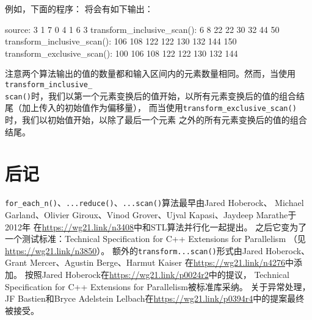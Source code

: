 例如，下面的程序：
将会有如下输出：
\begin{blacklisting}
    source:                      3 1 7 0 4 1 6 3
    transform_inclusive_scan():      6 8 22 22 30 32 44 50
    transform_inclusive_scan():      106 108 122 122 130 132 144 150
    transform_exclusive_scan():  100 106 108 122 122 130 132 144
\end{blacklisting}
注意两个算法输出的值的数量都和输入区间内的元素数量相同。然而，当使用\texttt{transform\_inclusive\_\\
scan()}时，我们以第一个元素变换后的值开始，以所有元素变换后的值的组合结尾（加上传入的初始值作为偏移量），
而当使用\texttt{transform\_exclusive\_scan()}时，我们以初始值开始，以除了最后一个元素
之外的所有元素变换后的值的组合结尾。

\section{后记}
\texttt{for\_each\_n()}、\texttt{...reduce()}、\texttt{...scan()}算法最早由Jared Hoberock、
Michael Garland、Olivier Giroux、Vinod Grover、Ujval Kapasi、Jaydeep Marathe于2012年
在\url{https://wg21.link/n3408}中和STL算法并行化一起提出。
之后它变为了一个测试标准：Technical Specification for C++ Extensions for Parallelism
（见\url{https://wg21.link/n3850}）。
额外的\texttt{transform...scan()}形式由Jared Hoberock、Grant Mercer、Agustin Berge、Harmut Kaiser
在\url{https://wg21.link/n4276}中添加。
按照Jared Hoberock在\url{https://wg21.link/p0024r2}中的提议，
Technical Specification for C++ Extensions for Parallelism被标准库采纳。
关于异常处理，JF Bastien和Bryce Adelstein Lelbach在\url{https://wg21.link/p0394r4}中的提案最终被接受。